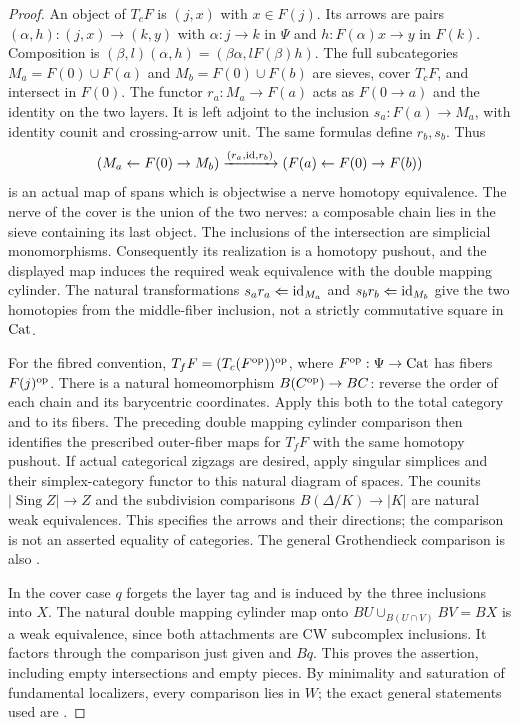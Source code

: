 \begin{proof}
An object of $T_cF$ is $(j,x)$ with $x\in F(j)$. Its arrows are pairs $(\alpha,h):(j,x)\to(k,y)$ with $\alpha:j\to k$ in $\Psi$ and $h:F(\alpha)x\to y$ in $F(k)$. Composition is $(\beta,l)(\alpha,h)=(\beta\alpha,lF(\beta)h)$. The full subcategories $M_a=F(0)\cup F(a)$ and $M_b=F(0)\cup F(b)$ are sieves, cover $T_cF$, and intersect in $F(0)$. The functor $r_a:M_a\to F(a)$ acts as $F(0\to a)$ and the identity on the two layers. It is left adjoint to the inclusion $s_a:F(a)\to M_a$, with identity counit and crossing-arrow unit. The same formulas define $r_b,s_b$. Thus
\[
 (M_a\leftarrow F(0)\to M_b)
 \xrightarrow{(r_a,\operatorname{id},r_b)}
 (F(a)\leftarrow F(0)\to F(b))
\]
is an actual map of spans which is objectwise a nerve homotopy equivalence. The nerve of the cover is the union of the two nerves: a composable chain lies in the sieve containing its last object. The inclusions of the intersection are simplicial monomorphisms. Consequently its realization is a homotopy pushout, and the displayed map induces the required weak equivalence with the double mapping cylinder. The natural transformations $s_ar_a\Leftarrow\operatorname{id}_{M_a}$ and $s_br_b\Leftarrow\operatorname{id}_{M_b}$ give the two homotopies from the middle-fiber inclusion, not a strictly commutative square in $\mathrm{Cat}$.

For the fibred convention, $T_fF=(T_c(F^{\mathrm{op}}))^{\mathrm{op}}$, where $F^{\mathrm{op}}:\Psi\to\mathrm{Cat}$ has fibers $F(j)^{\mathrm{op}}$. There is a natural homeomorphism $B(C^{\mathrm{op}})\to BC$: reverse the order of each chain and its barycentric coordinates. Apply this both to the total category and to its fibers. The preceding double mapping cylinder comparison then identifies the prescribed outer-fiber maps for $T_fF$ with the same homotopy pushout. If actual categorical zigzags are desired, apply singular simplices and their simplex-category functor to this natural diagram of spaces. The counits $|\operatorname{Sing}Z|\to Z$ and the subdivision comparisons $B(\Delta/K)\to|K|$ are natural weak equivalences. This specifies the arrows and their directions; the comparison is not an asserted equality of categories. The general Grothendieck comparison is also \cite[Theorem 26.8 and Corollary 26.9]{AChacholskiScherer}.

In the cover case $q$ forgets the layer tag and is induced by the three inclusions into $X$. The natural double mapping cylinder map onto $BU\cup_{B(U\cap V)}BV=BX$ is a weak equivalence, since both attachments are CW subcomplex inclusions. It factors through the comparison just given and $Bq$. This proves the assertion, including empty intersections and empty pieces. By minimality and saturation of fundamental localizers, every comparison lies in $W$; the exact general statements used are \cite[Proposition 4.2.4 and Corollary 4.2.19]{Cisinski2006B}.
\end{proof}

